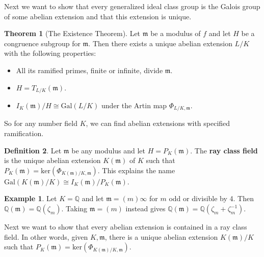 \documentclass{article}
\theoremstyle{definition}
\newtheorem{theorem}{Theorem}[section]
\newtheorem{example}{Example}[section]
\newtheorem{defn}[theorem]{Definition}
\begin{document}
Next we want to show that every generalized ideal class group is the Galois group of some abelian extension and that this extension is unique.
\begin{theorem}[The Existence Theorem]\label{theorem1.26}
    Let $\mathfrak{m}$ be a modulus of $f$ and let $H$ be a congruence subgroup for $\mathfrak{m}$. Then there exists a unique abelian extension $L/K$ with the following properties:
    \begin{itemize}
        \item All its ramified primes, finite or infinite, divide $\mathfrak{m}$.
        \item $H = T_{L/K}(\mathfrak{m})$.
        \item $I_K(\mathfrak{m})/H \cong \text{Gal}(L/K)$ under the Artin map $\Phi_{L/K,\mathfrak{m}}$.
    \end{itemize}
\end{theorem}
So for any number field $K$, we can find abelian extensions with specified ramification.
\begin{defn}
    Let $\mathfrak{m}$ be any modulus and let $H = P_K(\mathfrak{m})$. The \textbf{ray class field} is the unique abelian extension $K(\mathfrak{m})$ of $K$ such that $P_K(\mathfrak{m}) = \text{ker}(\Phi_{K(\mathfrak{m})/K, \mathfrak{m}})$. This explains the name $\text{Gal}(K(\mathfrak{m})/K) \cong I_K(\mathfrak{m})/P_K(\mathfrak{m})$.
\end{defn}
\begin{example}
    Let $K=\mathbb{Q}$ and let $\mathfrak{m} = (m)\infty$ for $m$ odd or divisible by 4. Then $\mathbb{Q}(\mathfrak{m}) = \mathbb{Q}(\zeta_m)$. Taking $\mathfrak{m} = (m)$ instead gives $\mathbb{Q}(\mathfrak{m}) = \mathbb{Q}(\zeta_m + \zeta_m^{-1})$.
\end{example}
Next we want to show that every abelian extension is contained in a ray class field.
In other words, given $K, \mathfrak{m}$, there is a unique abelian extension $K(\mathfrak{m})/K$ such that $P_K(\mathfrak{m}) = \text{ker}(\Phi_{K(\mathfrak{m})/K,\mathfrak{m}})$.
\end{document}
